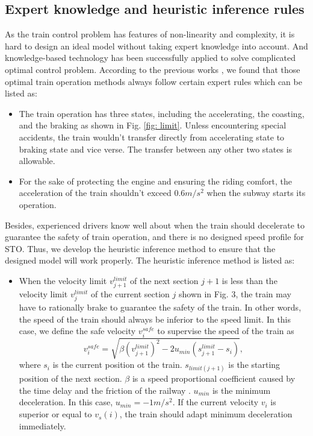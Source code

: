 \documentclass[journal]{IEEEtran}
\begin{document}
\subsection{Expert knowledge and heuristic inference rules}
As the train control problem has features of non-linearity and complexity, it is hard to design an ideal model without taking expert knowledge into account. And knowledge-based technology has been successfully applied to solve complicated optimal control problem\cite{murrell1997survey}. According to the previous works \cite{yin2016smart}\cite{cheng2017intelligent}\cite{zhao2017integrated}, we found that those optimal train operation methods always follow certain expert rules which can be listed as: 
\begin{itemize}
	\item The train operation has three states, including the accelerating, the coasting, and the braking as shown in Fig. \ref{fig: limit}. Unless encountering special accidents, the train wouldn't transfer directly from accelerating state to braking state and vice verse. The transfer between any other two states is allowable.   
	\item For the sake of protecting the engine and ensuring the riding comfort, the acceleration of the train shouldn't exceed \(0.6 m/s^2\) when the subway starts its operation. 
\end{itemize}	

\par Besides, experienced drivers know well about when the train should decelerate to guarantee the safety of train operation, and there is no designed speed profile for STO. Thus, we develop the heuristic inference method to ensure that the designed model will work properly. The heuristic inference method is listed as:

\begin{itemize}
	\item When the velocity limit \(v_{j+1}^{limit}\) of the next section \(j+1\) is less than the velocity limit \(v_{j}^{limit}\) of the current section \(j\) shown in Fig. 3, the train may have to rationally brake to guarantee the safety of the train. In other words, the speed of the train should always be inferior to the speed limit. In this case, we define the safe velocity \(v_{i}^{safe}\) to supervise the speed of the train as
	\begin{equation}
	v_{i}^{safe}=\sqrt{\beta(v_{j+1}^{limit})^2-2  u_{min}(s_{j+1}^{limit}-s_i)},
	\end{equation}
    where \(s_i\) is the current position ot the train. \(s_{limit(j+1)}\) is the starting position of the next section. \(\beta\) is a speed proportional coefficient caused by the time delay and the friction of the railway \cite{yin2016smart}. $u_{min}$ is the minimum deceleration. In this case, $u_{min} = -1m/s^2$. If the current velocity \(v_i\) is superior or equal to \(v_s(i)\), the train should adapt minimum deceleration immediately.
\end{itemize}	
\end{document}
